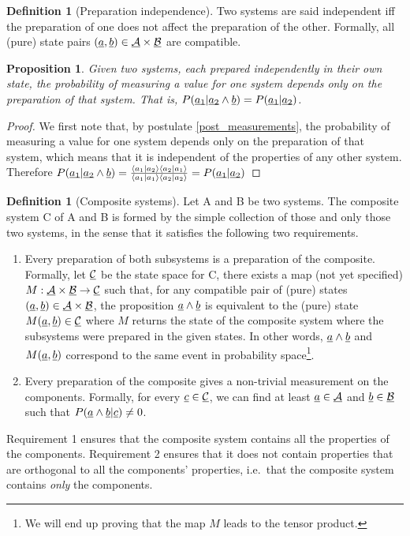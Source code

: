 \documentclass[aps,prl,amsmath,amssymb,twocolumn,nofootinbib]{revtex4}
\theoremstyle{plain}
\newtheorem{prop}[thrm]{Proposition}
\theoremstyle{definition}
\newtheorem{defn}[thrm]{Definition}
\theoremstyle{remark}
\newcommand{\pj}[1] {\underbar{$#1$}}
\def\>{\rangle}
\def\<{\langle}
\begin{document}
	\begin{defn}[Preparation independence]\label{def_indep}
		Two systems are said independent iff the preparation of one does not affect the preparation of the other. Formally, all (pure) state pairs $(\pj{a}, \pj{b}) \in \pj{\mathcal{A}}\times \pj{\mathcal{B}}$ are compatible.
	\end{defn}
	
	\begin{prop}\label{prop_singleBorn}
		Given two systems, each prepared independently in their own state, the probability of measuring a value for one system depends only on the preparation of that system. That is, $P(\pj{a_1}|\pj{a_2}\wedge \pj{b})=P(\pj{a_1}|\pj{a_2})$.
	\end{prop}
	\begin{proof}
		We first note that, by postulate \ref{post_measurements}, the probability of measuring a value for one system depends only on the preparation of that system, which means that it is independent of the properties of any other system. Therefore $P(\pj{a_1} | \pj{a_2} \wedge \pj{b}) = \frac{\<a_1| a_2 \> \< a_2 |a_1\>}{\< a_1 | a_1 \>\< a_2 | a_2 \>} = P(\pj{a_1} | \pj{a_2})$
	\end{proof}
	
	\begin{defn}[Composite systems]\label{def_comp}
		Let A and B be two systems. The composite system C of A and B is formed by the simple collection of those and only those two systems, in the sense that it satisfies the following two requirements.
		\begin{enumerate}
			\item Every preparation of both subsystems is a preparation of the
			composite. Formally, let $\pj{\mathcal{C}}$ be the state space
			for C, there exists a map (not yet specified)
			$M:\pj{\mathcal{A}}\times\pj{\mathcal{B}}\to\pj{\mathcal{C}}$
			such that, for any compatible pair of (pure) states $(\pj{a},\pj{b}) \in \pj{\mathcal{A}}\times\pj{\mathcal{B}}$, the proposition $\pj{a} \wedge \pj{b}$ is equivalent to the (pure) state $M(\pj{a},\pj{b}) \in \pj{\mathcal{C}}$ where $M$ returns the state of the composite system where the subsystems were prepared in the given states. In other words, $\pj{a} \wedge \pj{b}$ and $M(\pj{a},\pj{b})$ correspond to the same event in probability space\footnote{We will end up proving that the map $M$ leads to the tensor product.}.
			\item Every preparation of the composite gives a non-trivial measurement on the components. Formally, for every $\pj{c} \in \pj{\mathcal{C}}$, we can find at least $\pj{a} \in \pj{\mathcal{A}}$ and $\pj{b} \in \pj{\mathcal{B}}$ such that $P(\pj{a} \wedge \pj{b}|\pj{c})\neq 0$. 
		\end{enumerate}
		Requirement 1 ensures that the composite system contains all the properties of the components. Requirement 2 ensures that it does not contain properties that are orthogonal to all the components' properties, i.e.~that the composite system contains {\em only} the components.
	\end{defn}
	
\end{document}
